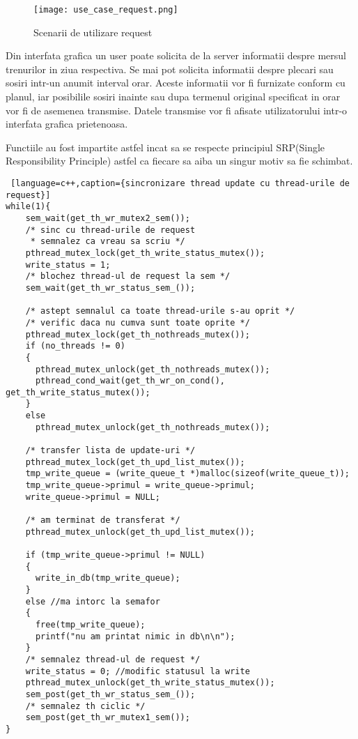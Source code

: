 \documentclass[runningheads]{llncs}
\begin{document}
\begin{figure}[htp]
    \centering
    \texttt{[image: use\_case\_request.png]}
    \caption{Scenarii de utilizare request}
\end{figure}

\indent Din interfata grafica un user poate solicita de la server informatii despre mersul trenurilor in ziua respectiva. Se mai pot solicita informatii despre plecari sau sosiri intr-un anumit interval orar. Aceste informatii vor fi furnizate conform cu planul, iar posibilile sosiri inainte sau dupa termenul original specificat in orar vor fi de asemenea transmise. Datele transmise vor fi afisate utilizatorului intr-o interfata grafica prietenoasa.

\indent Functiile au fost impartite astfel incat sa se respecte principiul SRP(Single Responsibility Principle) astfel ca fiecare sa aiba un singur motiv sa fie schimbat.

\begin{lstlisting} [language=c++,caption={sincronizare thread update cu thread-urile de request}]
while(1){
    sem_wait(get_th_wr_mutex2_sem());
    /* sinc cu thread-urile de request
     * semnalez ca vreau sa scriu */
    pthread_mutex_lock(get_th_write_status_mutex());
    write_status = 1;
    /* blochez thread-ul de request la sem */
    sem_wait(get_th_wr_status_sem_());

    /* astept semnalul ca toate thread-urile s-au oprit */
    /* verific daca nu cumva sunt toate oprite */
    pthread_mutex_lock(get_th_nothreads_mutex());
    if (no_threads != 0)
    {
      pthread_mutex_unlock(get_th_nothreads_mutex());
      pthread_cond_wait(get_th_wr_on_cond(), get_th_write_status_mutex());
    }
    else
      pthread_mutex_unlock(get_th_nothreads_mutex());

    /* transfer lista de update-uri */
    pthread_mutex_lock(get_th_upd_list_mutex());
    tmp_write_queue = (write_queue_t *)malloc(sizeof(write_queue_t));
    tmp_write_queue->primul = write_queue->primul;
    write_queue->primul = NULL;

    /* am terminat de transferat */
    pthread_mutex_unlock(get_th_upd_list_mutex());

    if (tmp_write_queue->primul != NULL)
    {
      write_in_db(tmp_write_queue);
    }
    else //ma intorc la semafor
    {
      free(tmp_write_queue);
      printf("nu am printat nimic in db\n\n");
    }
    /* semnalez thread-ul de request */
    write_status = 0; //modific statusul la write
    pthread_mutex_unlock(get_th_write_status_mutex());
    sem_post(get_th_wr_status_sem_());
    /* semnalez th ciclic */
    sem_post(get_th_wr_mutex1_sem());
}
\end{lstlisting}
\end{document}
